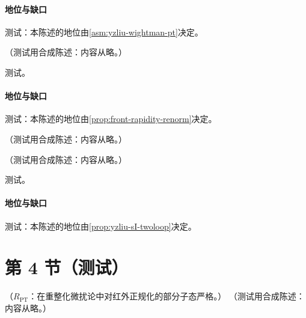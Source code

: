 \paragraph{地位与缺口}测试：本陈述的地位由\cref{asm:yzliu-wightman-pt}决定。

\begin{proposition}\label{prop:yzliu-rapidity-linear}
（测试用合成陈述：内容从略。）
\end{proposition}
\begin{proofsketch}测试。\end{proofsketch}
\paragraph{地位与缺口}测试：本陈述的地位由\cref{prop:front-rapidity-renorm}决定。

\begin{definition}[本征软函数的光锥定义]\label{def:yzliu-intrinsic-soft-lc}
（测试用合成陈述：内容从略。）
\end{definition}

\begin{theorem}\label{thm:yzliu-intrinsic-soft}
（测试用合成陈述：内容从略。）
\end{theorem}
\begin{proofsketch}测试。\end{proofsketch}
\paragraph{地位与缺口}测试：本陈述的地位由\cref{prop:yzliu-sI-twoloop}决定。

\section{第 4 节（测试）}\label{sec:yzliu-rapidity}

\begin{proposition}\label{prop:yzliu-sI-twoloop}
（$R_{\mathrm{PT}}$：在重整化微扰论中对红外正规化的部分子态严格。）
（测试用合成陈述：内容从略。）
\end{proposition}

